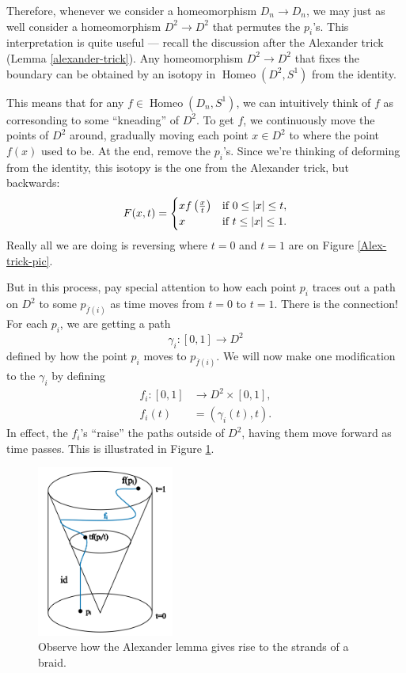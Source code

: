 \documentclass{amsart}
\DeclareMathOperator{\Homeo}{Homeo}
\begin{document}
Therefore, whenever we consider a homeomorphism \(D_n\to D_n\), we may just as
well consider a homeomorphism \(D^2\to D^2\) that permutes the \(p_i\)'s. This
interpretation is quite useful --- recall the discussion after the Alexander
trick (Lemma \ref{alexander-trick}). Any homeomorphism \(D^2\to D^2\) that
fixes the boundary can be obtained by an isotopy in \(\Homeo(D^2, S^1)\) from the
identity.

This means that for any \(f\in\Homeo(D_n, S^1)\), we can intuitively think of
\(f\) as corresonding to some ``kneading'' of \(D^2\). To get \(f\), we
continuously move the
points of \(D^2\) around, gradually moving each point \(x\in D^2\) to where the
point \(f(x)\) used to be. At the end, remove the \(p_i\)'s. Since we're
thinking of deforming from the identity, this isotopy is the one from the
Alexander trick, but backwards: 
\[
   F(x, t) = 
	\begin{cases}
		xf\left(\frac{x}{t}\right) &\text{if }0\le \abs{x}\le t,\\
		x &\text{if }t\le\abs{x}\le 1.
   \end{cases}
\]
Really all we are doing is reversing where \(t=0\) and \(t=1\) are on Figure
\ref{Alex-trick-pic}.

But in this process, pay special attention to how
each point \(p_i\) traces out a
path on \(D^2\) to some \(p_{\overline{f}(i)}\) as time moves from \(t=0\) to
\(t=1\). There is the connection! For each \(p_i\), we are getting a path 
\[
	\gamma_i: [0, 1]\to D^2
\] 
defined by how the point \(p_i\) moves to \(p_{\overline{f}(i)}\). We will
now make one modification to the \(\gamma_i\) by defining 
\begin{align*}
	f_i: [0, 1]&\to D^2\times [0, 1],\\
	f_i(t) &= (\gamma_i(t), t).
\end{align*} 
In effect, the \(f_i\)'s ``raise'' the paths outside of \(D^2\),
having them move forward as time passes. This is illustrated in Figure
\ref{alex-braid}.

\begin{figure}
   \centering
	\includegraphics[width = 0.4\textwidth]{Inkscape Files/alexander-braid.png}
	\caption{Observe how the Alexander lemma gives rise to the strands of a
	braid.}
	\label{alex-braid}
\end{figure}
\end{document}
